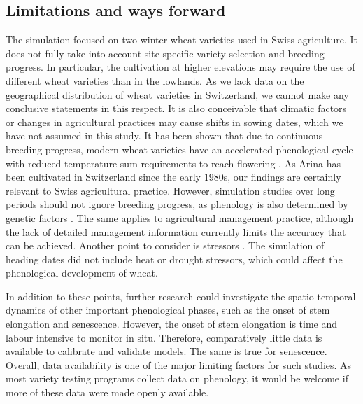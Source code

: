 \subsection{Limitations and ways forward}
The simulation focused on two winter wheat varieties used in Swiss agriculture. It does not fully take into account site-specific variety selection and breeding progress. In particular, the cultivation at higher elevations may require the use of different wheat varieties than in the lowlands. As we lack data on the geographical distribution of wheat varieties in Switzerland, we cannot make any conclusive statements in this respect. It is also conceivable that climatic factors or changes in agricultural practices may cause shifts in sowing dates, which we have not assumed in this study. It has been shown that due to continuous breeding progress, modern wheat varieties have an accelerated phenological cycle with reduced temperature sum requirements to reach flowering \citep{rezaei_climate_2018}. As Arina has been cultivated in Switzerland since the early 1980s, our findings are certainly relevant to Swiss agricultural practice. However, simulation studies over long periods should not ignore breeding progress, as phenology is also determined by genetic factors \citep{hyles_phenology_2020}. The same applies to agricultural management practice, although the lack of detailed management information currently limits the accuracy that can be achieved. Another point to consider is stressors \citep{perdomo_effects_2015}. The simulation of heading dates did not include heat or drought stressors, which could affect the phenological development of wheat.

In addition to these points, further research could investigate the spatio-temporal dynamics of other important phenological phases, such as the onset of stem elongation and senescence. However, the onset of stem elongation is time and labour intensive to monitor in situ. Therefore, comparatively little data is available to calibrate and validate models. The same is true for senescence. Overall, data availability is one of the major limiting factors for such studies. As most variety testing programs collect data on phenology, it would be welcome if more of these data were made openly available.

